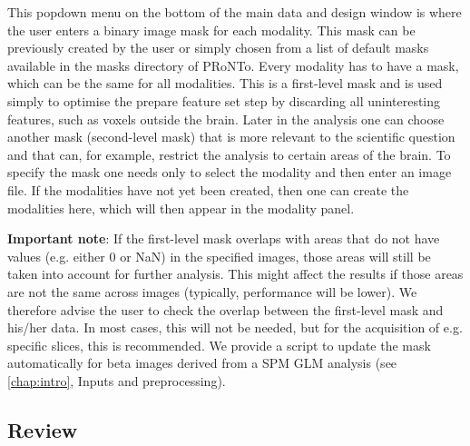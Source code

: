 This popdown menu on the bottom of the main data and design window is where the user enters a binary image mask for each modality. This mask can be previously created by the user or simply chosen from a list of default masks available in the masks directory of PRoNTo. Every modality has to have a mask, which can be the same for all modalities. This is a first-level mask and is used simply to optimise the prepare feature set step by discarding all uninteresting features, such as voxels outside the brain. Later in the analysis one can choose another mask (second-level mask) that is more relevant to the scientific question and that can, for example, restrict the analysis to certain areas of the brain. To specify the mask one needs only to select the modality and then enter an image file. If the modalities have not yet been created, then one can create the modalities here, which will then appear in the modality panel.

\textbf{Important note}: If the first-level mask overlaps with areas that do not have values (e.g. either 0 or NaN) in the specified images, those areas will still be taken into account for further analysis. This might affect the results if those areas are not the same across images (typically, performance will be lower). We therefore advise the user to check the overlap between the first-level mask and his/her data. In most cases, this will not be needed, but for the acquisition of e.g. specific slices, this is recommended. We provide a script to update the mask automatically for beta images derived from a SPM GLM analysis (see \ref{chap:intro}, Inputs and preprocessing).

\subsection{Review}

